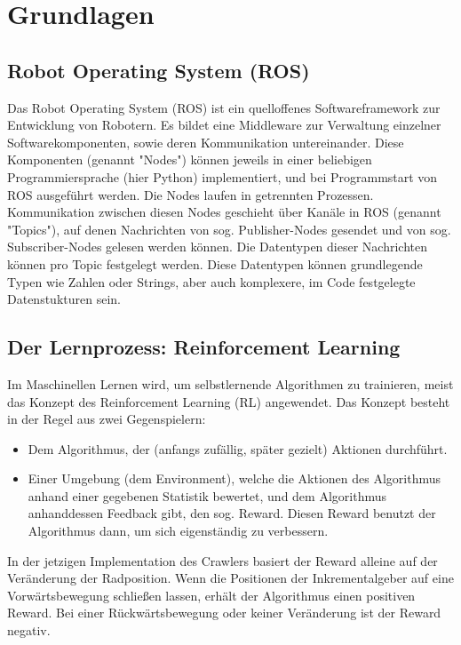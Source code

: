 \section{Grundlagen}


\subsection{Robot Operating System (ROS)}

Das Robot Operating System (ROS)\cite{ros} ist ein quelloffenes Softwareframework zur Entwicklung von Robotern. Es bildet eine Middleware zur Verwaltung einzelner Softwarekomponenten, sowie deren Kommunikation untereinander. Diese Komponenten (genannt "Nodes") können jeweils in einer beliebigen Programmiersprache (hier Python) implementiert, und bei Programmstart von ROS ausgeführt werden. Die Nodes laufen in getrennten Prozessen. Kommunikation zwischen diesen Nodes geschieht über Kanäle in ROS (genannt "Topics"), auf denen Nachrichten von sog. Publisher-Nodes gesendet und von sog. Subscriber-Nodes gelesen werden können. Die Datentypen dieser Nachrichten können pro Topic festgelegt werden. Diese Datentypen können grundlegende Typen wie Zahlen oder Strings, aber auch komplexere, im Code festgelegte Datenstukturen sein.

\subsection{Der Lernprozess: Reinforcement Learning}

Im Maschinellen Lernen wird, um selbstlernende Algorithmen zu trainieren, meist das Konzept des Reinforcement Learning (RL) angewendet. Das Konzept besteht in der Regel aus zwei Gegenspielern:
\begin{itemize}
    \item Dem Algorithmus, der (anfangs zufällig, später gezielt) Aktionen durchführt.
    \item Einer Umgebung (dem Environment), welche die Aktionen des Algorithmus anhand einer gegebenen Statistik bewertet, und dem Algorithmus anhanddessen Feedback gibt, den sog. Reward. Diesen Reward benutzt der Algorithmus dann, um sich eigenständig zu verbessern.
\end{itemize}

In der jetzigen Implementation des Crawlers basiert der Reward alleine auf der Veränderung der Radposition. Wenn die Positionen der Inkrementalgeber auf eine Vorwärtsbewegung schließen lassen, erhält der Algorithmus einen positiven Reward. Bei einer Rückwärtsbewegung oder keiner Veränderung ist der Reward negativ.

